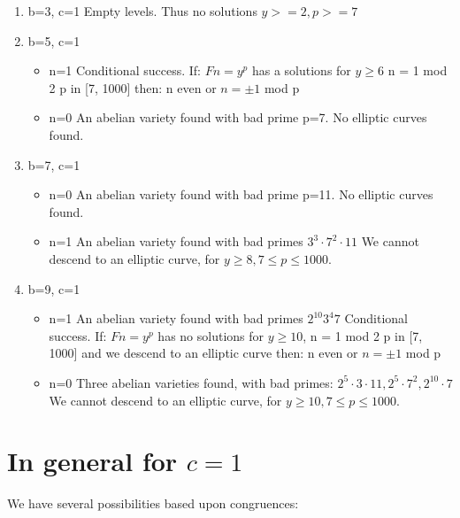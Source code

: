 \documentclass[12pt]{article}
\begin{document}
\begin{enumerate}
\item{b=3, c=1}
  Empty levels. Thus no solutions $y >= 2, p >= 7$
    
\item{b=5, c=1} 
\begin{itemize} 
  \item{n=1}
    Conditional success. If:
      $Fn = y^p$ has a solutions for $y \geq 6$ n = 1 mod 2 p in [7, 1000]
    then:
      n even or $n = \pm 1$ mod p
  \item{n=0}
    An abelian variety found with bad prime p=7.
    No elliptic curves found.
\end{itemize}  
\item{b=7, c=1}
\begin{itemize}
  \item{n=0}
    An abelian variety found with bad prime p=11.
    No elliptic curves found.
  \item{n=1}
    An abelian variety found with bad primes $3^3 \cdot 7^2 \cdot 11$
    We cannot descend to an elliptic curve,
      for $y \geq 8, 7 \leq p \leq 1000$.
\end{itemize}
\item{b=9, c=1}
\begin{itemize}
  
  \item{n=1}
    An abelian variety found with bad primes $2^{10} 3^4 7$
    Conditional success. If:
      $Fn = y^p$ has no solutions for $y \geq 10$, n = 1 mod 2 p in [7, 1000]
      and
      we descend to an elliptic curve
    then:
      n even or $n = \pm 1$ mod p
  \item{n=0}
    Three abelian varieties found, with bad primes:	
      $2^5 \cdot 3 \cdot 11, 2^5 \cdot 7^2, 2^{10} \cdot 7$
    We cannot descend to an elliptic curve,
      for $y \geq 10, 7 \leq p \leq 1000$.

\end{itemize}
\end{enumerate}

\section{In general for $c = 1$}

We have several possibilities based upon congruences:
\end{document}
